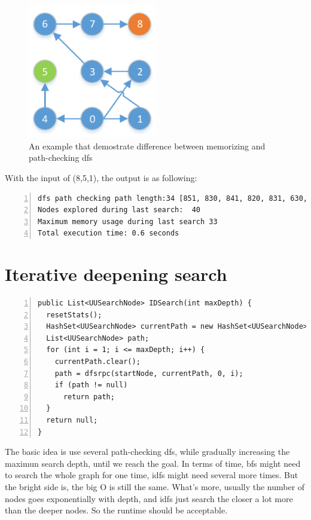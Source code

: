 \documentclass{article}
\begin{document}
\begin{figure}[!h]
\centering
\includegraphics[width=0.5\textwidth]{hw1-fig-2.pdf}
\caption{An example that demostrate difference between memorizing and path-checking dfs}
\label{diff}
\end{figure}

With the input of (8,5,1), the output is as following:

\begin{lstlisting}[numbers=left]
dfs path checking path length:34 [851, 830, 841, 820, 831, 630, 641, 540, 551, 530, 541, 520, 531, 430, 441, 420, 431, 410, 421, 320, 331, 310, 321, 300, 311, 210, 221, 200, 211, 100, 111, 10, 21, 0]
Nodes explored during last search:  40
Maximum memory usage during last search 33
Total execution time: 0.6 seconds
\end{lstlisting}













\section{Iterative deepening search}

\begin{lstlisting}[numbers=left]
public List<UUSearchNode> IDSearch(int maxDepth) {
  resetStats();
  HashSet<UUSearchNode> currentPath = new HashSet<UUSearchNode>();
  List<UUSearchNode> path;
  for (int i = 1; i <= maxDepth; i++) {
    currentPath.clear();
    path = dfsrpc(startNode, currentPath, 0, i);
    if (path != null)
      return path;
  }
  return null;
}
\end{lstlisting}

The basic idea is use several path-checking dfs, while gradually increasing the maximun search depth, until we reach the goal. In terms of time, bfs might need to search the whole graph for one time, idfs might need several more times. But the bright side is, the big O is still the same. What's more, usually the number of nodes goes exponentially with depth, and idfs just search the closer a lot more than the deeper nodes. So the runtime should be acceptable.
\end{document}
